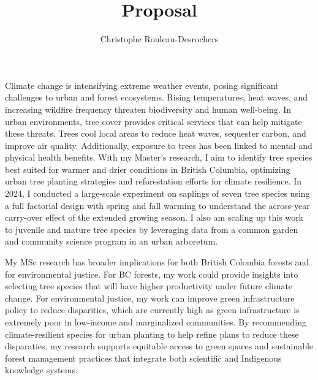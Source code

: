 \documentclass[11pt,letter]{article}
\title{Proposal}
\author{Christophe Rouleau-Desrochers}
\begin{document}

\maketitle

Climate change is intensifying extreme weather events, posing significant challenges to urban and forest ecosystems. Rising temperatures, heat waves, and increasing wildfire frequency threaten biodiversity and human well-being. In urban environments, tree cover provides critical services that can help mitigate these threats. Trees cool local areas to reduce heat waves, sequester carbon, and improve air quality. Additionally, exposure to trees has been linked to mental and physical health benefits. With my Master's research, I aim to identify tree species best suited for warmer and drier conditions in British Columbia, optimizing urban tree planting strategies and reforestation efforts for climate resilience.
In 2024, I conducted a large-scale experiment on saplings of seven tree species using a full factorial design with spring and fall warming to understand the across-year carry-over effect of the extended growing season. I also am scaling up this work to juvenile and mature tree species by leveraging data from a common garden and community science program in an urban arboretum. 

My MSc research has broader implications for both British Colombia forests and for environmental justice. For BC forests, my work could provide insights into selecting tree species that will have higher productivity under future climate change. For environmental justice, my work can improve green infrastructure policy to reduce disparities, which are currently high as green infrastructure is extremely poor in low-income and marginalized communities. By recommending climate-resilient species for urban planting to help refine plans to reduce these disparaties, my research supports equitable access to green spaces and sustainable forest management practices that integrate both scientific and Indigenous knowledge systems. %
\end{document}
